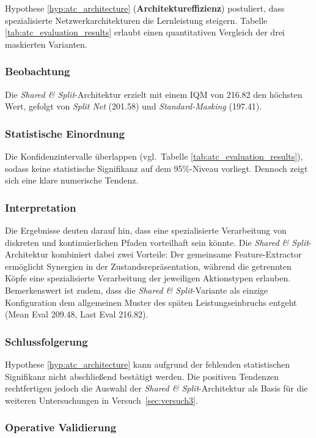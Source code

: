Hypothese \ref{hyp:atc_architecture} (\textbf{Archi\-tek\-tur\-effi\-zi\-enz}) postuliert, dass spezialisierte Netzwerkarchitekturen die Lernleistung steigern. Tabelle \ref{tab:atc_evaluation_results} erlaubt einen quantitativen Vergleich der drei maskierten Varianten.

\subsubsection*{Beobachtung}
Die \emph{Shared \& Split}-Architektur erzielt mit einem \ac{IQM} von 216.82 den höchsten Wert, gefolgt von \emph{Split Net} (201.58) und \emph{Standard-Masking} (197.41).

\subsubsection*{Statistische Einordnung}
Die Konfidenzintervalle überlappen (vgl.~Tabelle \ref{tab:atc_evaluation_results}), sodass keine statistische Signifikanz auf dem 95\%-Niveau vorliegt. Dennoch zeigt sich eine klare numerische Tendenz.

\subsubsection*{Interpretation}
Die Ergebnisse deuten darauf hin, dass eine spezialisierte Verarbeitung von diskreten und kontinuierlichen Pfaden vorteilhaft sein könnte. Die \emph{Shared \& Split}-Architektur kombiniert dabei zwei Vorteile: Der gemeinsame Feature-Extractor ermöglicht Synergien in der Zustandsrepräsentation, während die getrennten Köpfe eine spezialisierte Verarbeitung der jeweiligen Aktionstypen erlauben. Bemerkenswert ist zudem, dass die \emph{Shared \& Split}-Variante als einzige Konfiguration dem allgemeinen Muster des späten Leistungseinbruchs entgeht (Mean Eval 209.48, Last Eval 216.82).

\subsubsection*{Schlussfolgerung}
Hypothese \ref{hyp:atc_architecture} kann aufgrund der fehlenden statistischen Signifikanz nicht abschließend bestätigt werden. Die positiven Tendenzen rechtfertigen jedoch die Auswahl der \emph{Shared \& Split}-Architektur als Basis für die weiteren Untersuchungen in Versuch~\ref{sec:versuch3}.

\subsubsection{Operative Validierung}
\label{subsubsec:operational_validation}

